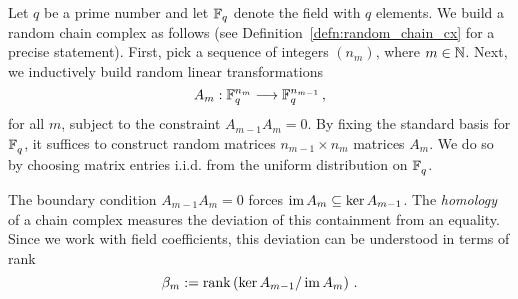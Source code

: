 %

Let $q$ be a prime number and let $\mathbb{F}_q$ denote the field with $q$ elements.
We build a random chain complex as follows (see Definition~\ref{defn:random_chain_cx}
for a precise statement). First, pick a 
sequence of integers $(n_m)$, where $m \in \mathbb{N}$. Next, we inductively
build random linear transformations 
\[
  A_m : \mathbb{F}_q^{n_m} \longrightarrow \mathbb{F}_q^{n_{m-1}} \, ,
\]
for all $m$, subject to the constraint $A_{m-1} A_m = 0$. By fixing the
standard basis for $\mathbb{F}_q^{}$, it suffices to construct random
matrices $n_{m-1} \times n_m$ matrices $A_m$. We do so by 
choosing matrix entries i.i.d. from the uniform distribution on
$\mathbb{F}_q^{}$. 


The boundary condition $A_{m-1}A_m=0$ forces $\operatorname{\mathrm{im}} A_m \subseteq \ker A_{m-1}$.
The {\em homology} of a chain complex measures the deviation of this containment
from an equality. Since we work with field coefficients, this deviation can
be understood in terms of rank
\begin{equation}
  \beta_m := \mathrm{rank} \left(\ker A_{m-1} / \operatorname{\mathrm{im}} A_m \right)\, .
  \label{eqn:betti_numbers}
\end{equation}

